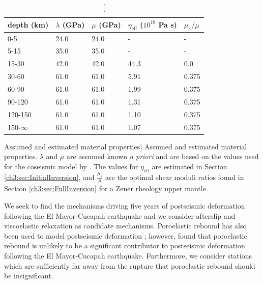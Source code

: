 \begin{table}\label{ch3:tab:MaterialProperties}
\begin{tabular} {l l l l l}
depth (km) &$\lambda$ (GPa)&$\mu$ (GPa)&$\eta_\mathrm{eff}$ ($10^{18}$ Pa s) & $\mu_\mathrm{k}/\mu$\\ \hline
0-5 & 24.0 & 24.0 & - & -\\
5-15 & 35.0 & 35.0 & - & -\\
15-30 & 42.0 & 42.0 & 44.3 & 0.0\\
30-60 & 61.0 & 61.0 & 5.91 & 0.375\\
60-90 & 61.0 & 61.0 & 1.99 & 0.375\\
90-120 & 61.0 & 61.0 & 1.31 & 0.375\\
120-150 & 61.0 & 61.0 & 1.10 & 0.375\\
150-$\infty$ & 61.0 & 61.0 & 1.07 & 0.375\\
\end{tabular}
\caption
[Assumed and estimated material properties]
{Assumed and estimated material properties. $\lambda$ and
$\mu$ are assumed known \textit{a priori} and are based on the values
used for the coseismic model by \citet{Wei2011}.  The values for
$\eta_\mathrm{eff}$ are estimated in Section
\ref{ch3:sec:InitialInversion}, and $\frac{\mu_k}{\mu}$ are the
optimal shear moduli ratios found in Section
\ref{ch3:sec:FullInversion} for a Zener rheology upper mantle.}
\end{table}

We seek to find the mechanisms driving five years of postseismic
deformation following the El Mayor-Cucapah earthquake and we consider
afterslip and viscoelastic relaxation as candidate mechanisms.
Poroelastic rebound has also been used to model postseismic
deformation \citep[e.g.,][]{Jonsson2003}; however,
\citet{Gonzalez-ortega2014} found that poroelastic rebound is unlikely
to be a significant contributor to postseismic deformation following
the El Mayor-Cucapah earthquake. Furthermore, we consider stations
which are sufficiently far away from the rupture that poroelastic
rebound should be insignificant.

